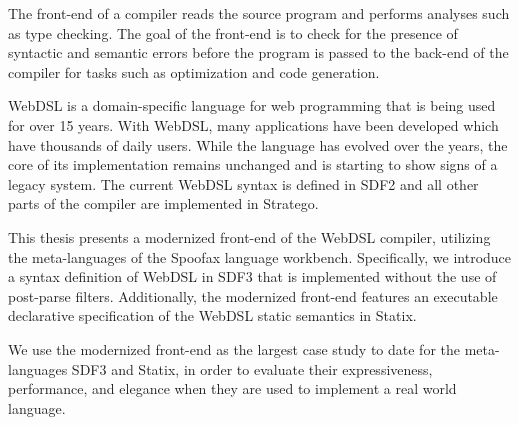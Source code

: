 
The front-end of a compiler reads the source program and performs analyses such as type checking. The goal of the front-end is to check for the presence of syntactic and semantic errors before the program is passed to the back-end of the compiler for tasks such as optimization and code generation.

WebDSL is a domain-specific language for web programming that is being used for over 15 years. With WebDSL, many applications have been developed which have thousands of daily users. While the language has evolved over the years, the core of its implementation remains unchanged and is starting to show signs of a legacy system. The current WebDSL syntax is defined in SDF2 and all other parts of the compiler are implemented in Stratego.

This thesis presents a modernized front-end of the WebDSL compiler, utilizing the meta-languages of the Spoofax language workbench. Specifically, we introduce a syntax definition of WebDSL in SDF3 that is implemented without the use of post-parse filters. Additionally, the modernized front-end features an executable declarative specification of the WebDSL static semantics in Statix.

We use the modernized front-end as the largest case study to date for the meta-languages SDF3 and Statix, in order to evaluate their expressiveness, performance, and elegance when they are used to implement a real world language.
